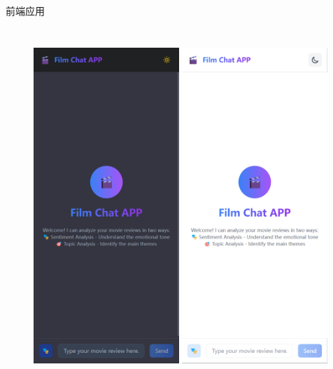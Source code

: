 \documentclass{beamer}
\begin{document}
\begin{frame}{前端应用}
\begin{columns}[T]
        \vspace{-0.5cm}
        \begin{figure}
            \includegraphics[width=0.49\textwidth]{pic/front1.png}
            \includegraphics[width=0.49\textwidth]{pic/front2.png}
        \end{figure}
    \end{columns}
\end{frame}
\end{document}
